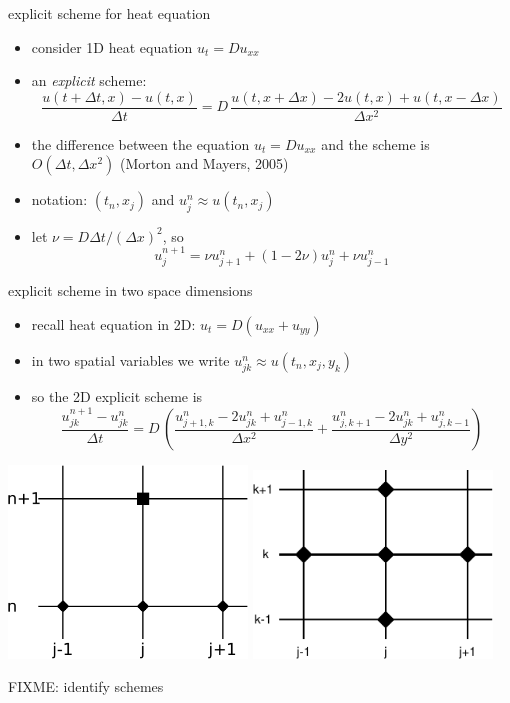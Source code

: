 \documentclass[titlepage,letterpaper,final,11pt]{scrartcl}
\begin{document}
explicit scheme for heat equation

\begin{itemize}
\item consider 1D heat equation $u_t = D u_{xx}$
\item an \emph{explicit} scheme:
	$$\frac{u(t+\Delta t,x) - u(t,x)}{\Delta t} = D\,\frac{u(t,x+\Delta x) - 2 u(t,x) + u(t,x-\Delta x)}{\Delta x^2}$$
\item the difference between the equation $u_t = D u_{xx}$ and the scheme is $O(\Delta t,\Delta x^2)$ (Morton and Mayers, 2005)\nocite{MortonMayers}
\item notation: $(t_n,x_j)$ and $u_j^n \approx u(t_n,x_j)$
\item let $\nu = D \Delta t / (\Delta x)^2$, so
	$$u_j^{n+1} = \nu u_{j+1}^n + (1 - 2 \nu) u_j^n + \nu u_{j-1}^n$$
\end{itemize}


explicit scheme in two space dimensions

\begin{itemize}
\item recall heat equation in 2D: $u_t = D(u_{xx} + u_{yy})$
\item in two spatial variables we write $u_{jk}^n \approx u(t_n,x_j,y_k)$
\item so the 2D explicit scheme is
	$$\frac{u_{jk}^{n+1} - u_{jk}^n}{\Delta t} = D\,\left(\frac{u_{j+1,k}^n - 2 u_{jk}^n + u_{j-1,k}^n}{\Delta x^2} + \frac{u_{j,k+1}^n - 2 u_{jk}^n + u_{j,k-1}^n}{\Delta y^2}\right)$$
\end{itemize}

\begin{center}
\includegraphics[width=2.5in]{expstencil}
\quad
\includegraphics[width=2.5in]{exp2dstencil}

FIXME: identify schemes
\end{center}
\end{document}
